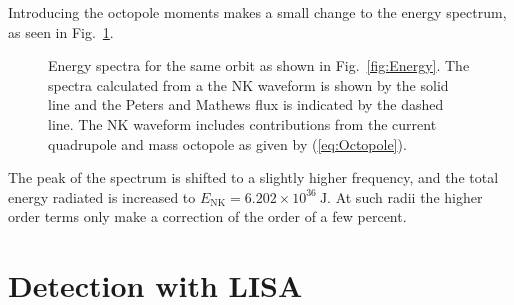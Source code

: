 \documentclass[useAMS,usedcolumn,usegraphicx,usenatbib]{mn2e}
\newcommand{\eqnref}[1]{(\ref{eq:#1})}
\newcommand{\figref}[1]{Fig.~\ref{fig:#1}}
\newcommand{\units}[1]{\ensuremath{~\mathrm{#1}}}
\newcommand{\sub}[1]{\ensuremath{_\mathrm{#1}}}
\begin{document}
Introducing the octopole moments makes a small change to the energy spectrum, as seen in \figref{Energy_oct}.
\begin{figure}
  \begin{center}
    \caption{Energy spectra for the same orbit as shown in \figref{Energy}. The spectra calculated from a the NK waveform is shown by the solid line and the Peters and Mathews flux is indicated by the dashed line. The NK waveform includes contributions from the current quadrupole and mass octopole as given by \eqnref{Octopole}.}
    \label{fig:Energy_oct}
  \end{center}
\end{figure}
The peak of the spectrum is shifted to a slightly higher frequency, and the total energy radiated is increased to $E\sub{NK} = 6.202 \times 10^{36}\units{J}$. At such radii the higher order terms only make a correction of the order of a few percent.

\section{Detection with LISA}\label{sec:Detector}
\end{document}
